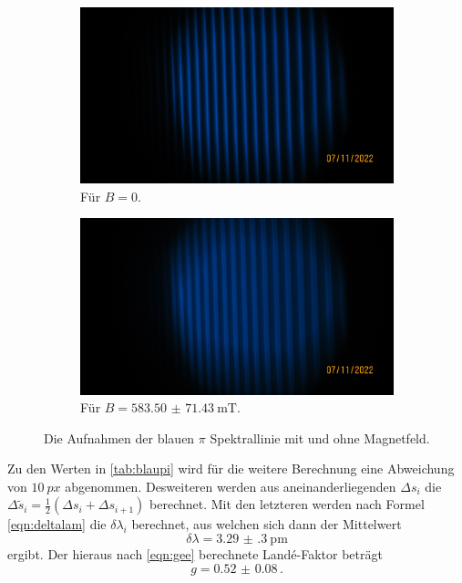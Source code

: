     \begin{figure}%
      \begin{subfigure}{0.48\textwidth}%
        \centering%
        \includegraphics[width=\textwidth]{pictures/IMG_0009.JPG}%
        \caption{Für $B = \num{0}$.}%
        \label{fig:pic_blaup_0}%
      \end{subfigure}%
      \hfill%
      \begin{subfigure}{0.48\textwidth}%
        \centering%
        \includegraphics[width=\textwidth]{pictures/IMG_0010.JPG}%
        \caption{Für $B = \SI{583.50(7143)}{\milli\tesla}$.}%
        \label{fig:pic_blaup_B}%
      \end{subfigure}%
      \caption{Die Aufnahmen der blauen $\pi$ Spektrallinie mit und ohne Magnetfeld.}%
      \label{fig:blaup}%
    \end{figure}

    \noindent
    Zu den Werten in \autoref{tab:blaupi} wird für die weitere Berechnung eine Abweichung von $\SI{10}{px}$ abgenommen. Desweiteren werden aus aneinanderliegenden 
    $\Delta s_i$ die $\Delta \tilde{s}_i = \frac{1}{2} (\Delta s_i + \Delta s_{i+1})$ berechnet. Mit den letzteren werden nach Formel \eqref{eqn:deltalam} 
    die $\delta \lambda_i$ berechnet, aus welchen sich dann der Mittelwert 
    \begin{equation*}
      \delta \lambda = \SI{3.29(30)}{\pico\metre}
    \end{equation*}
    ergibt. Der hieraus nach \eqref{eqn:gee} berechnete Land\'{e}-Faktor beträgt 
    \begin{equation*}
      g = \num{0.52(8)}\, .
    \end{equation*}

